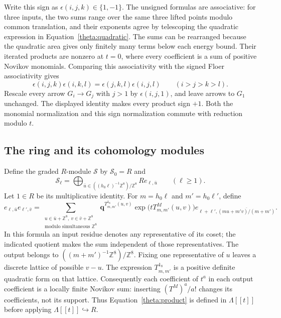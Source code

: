 \documentclass[11pt]{article}
\theoremstyle{definition}
\theoremstyle{remark}
\numberwithin{equation}{section}
\begin{document}
Write this sign as $\epsilon(i,j,k)\in\{1,-1\}$.  The unsigned formulas
are associative: for three inputs, the two sums range over the same
three lifted points modulo common translation, and their exponents agree
by telescoping the quadratic expression in
Equation~\eqref{theta:quadratic}.  The sums can be rearranged because the
quadratic area gives only finitely many terms below each energy bound.
Their iterated products are nonzero at $t=0$, where every coefficient is
a sum of positive Novikov monomials.  Comparing this associativity with
the signed Floer associativity gives
\[
 \epsilon(i,j,k)\epsilon(i,k,l)
   =\epsilon(j,k,l)\epsilon(i,j,l)\qquad(i>j>k>l).
\]
Rescale every arrow $G_i\to G_j$ with $j>1$ by
$\epsilon(i,j,1)$, and leave arrows to $G_1$ unchanged.  The displayed
identity makes every product sign $+1$.  Both the monomial normalization
and this sign normalization commute with reduction modulo $t$.

\subsection{The ring and its cohomology modules}

Define the graded $R$-module $\mathscr S$ by $\mathscr S_0=R$ and
\[
 \mathscr S_\ell=
 \bigoplus_{\bar u\in ((h_0\ell)^{-1}\mathbb Z^8)/\mathbb Z^8}
       R e_{\ell,\bar u}\qquad(\ell\geq1).
\]
Let $1\in R$ be its multiplicative identity.  For
$m=h_0\ell$ and $m'=h_0\ell'$, define
\begin{equation}\label{theta:product}
 e_{\ell,\bar u}e_{\ell',\bar v}
 =\sum_{\substack{u\in\bar u+\mathbb Z^8,\ v\in\bar v+\mathbb Z^8\\
                         \text{modulo simultaneous }\mathbb Z^8}}
  \mathbf q^{T^{1_8}_{m,m'}(u,v)}
  \exp\bigl(tT^M_{m,m'}(u,v)\bigr)
  e_{\ell+\ell',\overline{(mu+m'v)/(m+m')}}.
\end{equation}
In this formula an input residue denotes any representative of its coset;
the indicated quotient makes the sum independent of those representatives.
The output belongs to $((m+m')^{-1}\mathbb Z^8)/\mathbb Z^8$.
Fixing one representative of $u$ leaves a discrete lattice of possible
$v-u$.  The expression $T^{1_8}_{m,m'}$ is a positive definite quadratic
form on that lattice.  Consequently each coefficient of $t^a$ in each
output coefficient is a locally finite Novikov sum: inserting
$(T^M)^a/a!$ changes its coefficients, not its support.  Thus
Equation~\eqref{theta:product} is defined in $\Lambda[[t]]$ before applying
$\Lambda[[t]]\hookrightarrow R$.
\end{document}
